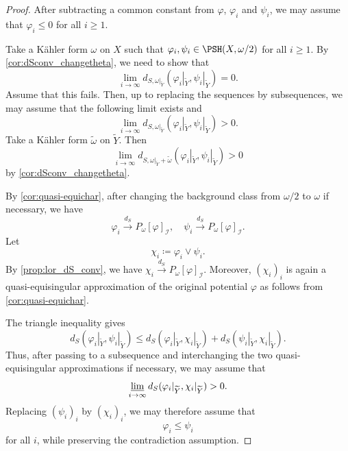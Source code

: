 \begin{proof}
After subtracting a common constant from $\varphi$, $\varphi_i$ and $\psi_i$, we may assume that $\varphi_i\leq 0$ for all $i\geq 1$.

Take a K\"ahler form $\omega$ on $X$ such that $\varphi_i,\psi_i\in \PSH(X,\omega/2)$ for all $i\geq 1$. By \cref{cor:dSconv_changetheta}, we need to show that
\[
\lim_{i\to\infty} d_{S,\omega|_{\widetilde{Y}}}\left(\varphi_i|_{\widetilde{Y}},\psi_i|_{\widetilde{Y}}\right)=0.
\]
Assume that this fails. Then, up to replacing the sequences by subsequences, we may assume that the following limit exists and
\[
\lim_{i\to\infty} d_{S,\omega|_{\widetilde{Y}}}\left(\varphi_i|_{\widetilde{Y}},\psi_i|_{\widetilde{Y}}\right)>0.
\]
Take a K\"ahler form $\tilde{\omega}$ on $\widetilde{Y}$. Then
\[
\lim_{i\to\infty} d_{S,\omega|_{\widetilde{Y}}+\tilde{\omega}}\left(\varphi_i|_{\widetilde{Y}},\psi_i|_{\widetilde{Y}}\right)>0
\]
by \cref{cor:dSconv_changetheta}.

By \cref{cor:quasi-equichar}, after changing the background class from $\omega/2$ to $\omega$ if necessary, we have
\[
    \varphi_i\xrightarrow{d_S}P_{\omega}[\varphi]_{\mathcal I},\quad \psi_i\xrightarrow{d_S}P_{\omega}[\varphi]_{\mathcal I}.
\]
Let
\[
    \chi_i\coloneqq \varphi_i\lor\psi_i.
\]
By \cref{prop:lor_dS_conv}, we have $\chi_i\xrightarrow{d_S} P_{\omega}[\varphi]_{\mathcal{I}}$. Moreover, $(\chi_i)_i$ is again a quasi-equisingular approximation of the original potential $\varphi$ as follows from \cref{cor:quasi-equichar}.

The triangle inequality gives
\[
d_S(\varphi_i|_{\widetilde{Y}},\psi_i|_{\widetilde{Y}}) \leq  d_S(\varphi_i|_{\widetilde{Y}},\chi_i|_{\widetilde{Y}})+ d_S(\psi_i|_{\widetilde{Y}},\chi_i|_{\widetilde{Y}}).
\]
Thus, after passing to a subsequence and interchanging the two quasi-equisingular approximations if necessary, we may assume that
\[
    \varliminf_{i\to\infty}d_S(\varphi_i|_{\widetilde{Y}},\chi_i|_{\widetilde{Y}})>0.
\]
Replacing $(\psi_i)_i$ by $(\chi_i)_i$, we may therefore assume that
\[
    \varphi_i\leq \psi_i
\]
for all $i$, while preserving the contradiction assumption.




\end{proof}
